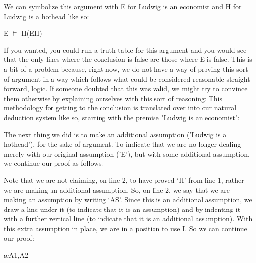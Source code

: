 We can symbolize this argument with E for Ludwig is an economist and H for Ludwig is a hothead like so:
\begin{center}
E $\vDash$ H\eif (E\eand H)
\end{center}
If you wanted, you could run a truth table for this argument and you would see that the only lines where the conclusion is false are those where E is false. This is a bit of a problem because, right now, we do not have a way of proving this sort of argument in a way which follows what could be considered reasonable straight-forward, logic. If someone doubted that this was valid, we might try to convince them otherwise by explaining ourselves with this sort of reasoning:
This methodology for getting to the conclusion is translated over into our natural deduction system like so, starting with the premise "Ludwig is an economist":
	\begin{fitchproof}
	\end{fitchproof}				

The next thing we did is to make an additional assumption ('Ludwig is a hothead'), for the sake of argument. To indicate that we are no longer dealing merely with our original assumption ('E'), but with some additional assumption, we continue our proof as follows:
	\begin{fitchproof}
		\open
	\end{fitchproof}				
Note that we are not claiming, on line 2, to have proved `H' from line 1, rather we are making an additional assumption. So, on line 2, we say that we are making an assumption by writing `AS'. Since this is an additional assumption, we draw a line under it (to indicate that it is an assumption) and by indenting it with a further vertical line (to indicate that it is an additional assumption). With this extra assumption in place, we are in a position to use \eand I. So we can continue our proof:
\begin{fitchproof}
	\open
		 \ae{A1,A2}
	\close
\end{fitchproof}

